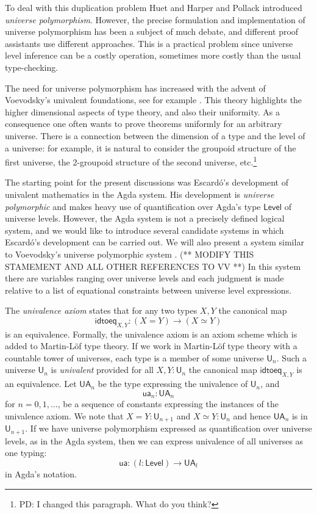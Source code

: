 \documentclass[11pt,a4paper]{article}
\def\UU{\mathsf{U}}
\def\Level{\mathsf{Level}}
\newcommand{\idtoeq}{\mathsf{idtoeq}}
\newcommand{\ua}{\mathsf{ua}}
\newcommand{\UA}{\mathsf{UA}}
\begin{document}
To deal with this duplication problem Huet \cite{Huet87} and Harper and Pollack \cite{HarperP91} introduced {\em universe polymorphism}. However, the precise formulation and implementation of universe polymorphism has been a subject of much debate, and different proof assistants use different approaches. This is a practical problem since universe level inference can be a costly operation, sometimes more costly than the usual type-checking.

The need for universe polymorphism has increased with the advent of Voevodsky's univalent foundations, see for example \cite{VV}. This theory highlights the higher dimensional aspects of type theory, and also their uniformity. As a consequence one often wants to prove theorems uniformly for an arbitrary universe. There is a connection between the dimension of a type and the level of a universe: for example, it is natural to consider the groupoid structure of the first universe, the 2-groupoid structure of the second universe, etc.\footnote{PD: I changed this paragraph. What do you think?}

The starting point for the present discussions was Escard\'o's \cite{escardo} development of univalent mathematics in the Agda system. His development is {\em universe polymorphic} and makes heavy use of quantification over Agda's type $\Level$ of universe levels. However, the Agda system is not a precisely defined logical system, and we would like to introduce several candidate systems in which Escard\'o's development can be carried out. We will also present a system similar to Voevodsky's universe polymorphic system \cite{VV}. (** MODIFY THIS STAMEMENT AND ALL OTHER REFERENCES TO VV **) In this system there are variables ranging over universe levels and each judgment is made relative to a list of equational constraints between universe level expressions.


The {\em univalence axiom} states that for any two types $X,Y$ the canonical map
$$
\idtoeq_{X,Y} : (X=Y)\to (X\simeq Y)
$$
is an equivalence. Formally, the univalence axiom is an axiom scheme which is added to Martin-Löf type theory. If we work in Martin-Löf type theory with a countable tower of universes, each type is a member of some universe $\UU_n$. Such a universe $\UU_n$ is {\em univalent} provided for all $X,Y : \UU_n$ the canonical map $\idtoeq_{X,Y}$ is an equivalence. Let $\UA_n$ be the type expressing the univalence of $\UU_n$, and
$$
\ua_n : \UA_n
$$
for $n = 0,1,\ldots$, be a sequence of constants expressing the instances of the univalence axiom. We note that $X = Y : \UU_{n+1}$ and $X\simeq Y : \UU_n$ and hence $\UA_n$ is in $\UU_{n+1}$. If we have universe polymorphism expressed as quantification over universe levels, as in the Agda system, then we can express univalence of all universes as one typing:
$$
\ua : (l : \Level) \to \UA_l
$$
in Agda's notation.
\end{document}
